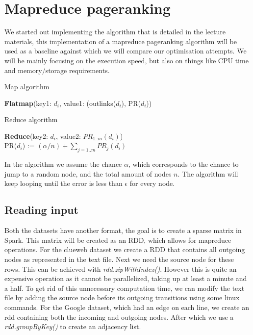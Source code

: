 \documentclass{article}
\begin{document}


\section{Mapreduce pageranking}
We started out implementing the algorithm that is detailed in the lecture materials, this implementation of a mapreduce pageranking algorithm will be used as a baseline against which we will compare our optimisation attempts. We will be mainly focusing on the execution speed, but also on things like CPU time and memory/storage requirements.

\LinesNumbered
\begin{algorithm}[ht]
  \caption{Map algorithm\label{alg}}
  \textbf{Flatmap}(key1: $d_i$, value1: (outlinks($d_i$), PR($d_i$)) \\ \Indp
\end{algorithm}

\LinesNumbered
\begin{algorithm}[ht]
  \caption{Reduce algorithm\label{alg2}}
  \textbf{Reduce}(key2: $d_i$, value2: $PR_{1..m}(d_i)$) \\ \Indp 
    PR($d_i$) := $(\alpha / n) + \sum_{j = 1..m}{PR_j(d_i)}$
  
\end{algorithm}
In the algorithm we assume the chance $\alpha$, which corresponds to the chance to jump to a random node, and the total amount of nodes $n$. The algorithm will keep looping until the error is less than $\epsilon$ for every node.

\subsection{Reading input}
Both the datasets have another format, the goal is to create a sparse matrix in Spark. This matrix will be created as an RDD, which allows for mapreduce operations.
For the clueweb dataset we create a RDD that contains all outgoing nodes as represented in the text file. Next we need the source node for these rows. This can be achieved with \emph{rdd.zipWithIndex()}. However this is quite an expensive operation as it cannot be parallelized, taking up at least a minute and a half. To get rid of this unnecessary computation time, we can modify the text file by adding the source node before its outgoing transitions using some linux commands.
For the Google dataset, which had an edge on each line, we create an rdd containing both the incoming and outgoing nodes. After which we use a \emph{rdd.groupByKey()} to create an adjacency list.
\end{document}
